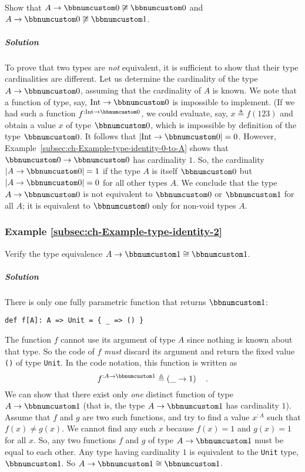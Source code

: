 Show that $A\rightarrow\bbnum 0\not\cong\bbnum 0$ and $A\rightarrow\bbnum 0\not\cong\bbnum 1$.

\subparagraph{Solution}

To prove that two types are \emph{not} equivalent, it is sufficient
to show that their type cardinalities are different. Let us determine
the cardinality of the type $A\rightarrow\bbnum 0$, assuming that
the cardinality of $A$ is known. We note that a function of type,
say, $\text{Int}\rightarrow\bbnum 0$ is impossible to implement.
(If we had such a function $f^{:\text{Int}\rightarrow\bbnum 0}$,
we could evaluate, say, $x\triangleq f(123)$ and obtain a value $x$
of type $\bbnum 0$, which is impossible by definition of the type
$\bbnum 0$. It follows that $\left|\text{Int}\rightarrow\bbnum 0\right|=0$.
However, Example~\ref{subsec:ch-Example-type-identity-0-to-A} shows
that $\bbnum 0\rightarrow\bbnum 0$ has cardinality $1$. So, the
cardinality $\left|A\rightarrow\bbnum 0\right|=1$ if the type $A$
is itself $\bbnum 0$ but $\left|A\rightarrow\bbnum 0\right|=0$ for
all other types $A$. We conclude that the type $A\rightarrow\bbnum 0$
is not equivalent to $\bbnum 0$ or $\bbnum 1$ for all $A$; it is
equivalent to $\bbnum 0$ only for non-void types $A$.

\subsubsection{Example \label{subsec:ch-Example-type-identity-2}\ref{subsec:ch-Example-type-identity-2}}

Verify the type equivalence $A\rightarrow\bbnum 1\cong\bbnum 1$.

\subparagraph{Solution}

There is only one fully parametric function that returns $\bbnum 1$:
\begin{lstlisting}
def f[A]: A => Unit = { _ => () }
\end{lstlisting}
The function $f$ cannot use its argument of type $A$ since nothing
is known about that type. So the code of $f$ \emph{must} discard
its argument and return the fixed value \lstinline!()! of type \lstinline!Unit!.
In the code notation, this function is written as
\[
f^{:A\rightarrow\bbnum 1}\triangleq\left(\_\rightarrow1\right)\quad.
\]
We can show that there exist only \emph{one} distinct function of
type $A\rightarrow\bbnum 1$ (that is, the type $A\rightarrow\bbnum 1$
has cardinality $1$). Assume that $f$ and $g$ are two such functions,
and try to find a value $x^{:A}$ such that $f(x)\neq g(x)$. We cannot
find any such $x$ because $f(x)=1$ and $g(x)=1$ for all $x$. So,
any two functions $f$ and $g$ of type $A\rightarrow\bbnum 1$ must
be equal to each other. Any type having cardinality $1$ is equivalent
to the \lstinline!Unit! type, $\bbnum 1$. So $A\rightarrow\bbnum 1\cong\bbnum 1$.

